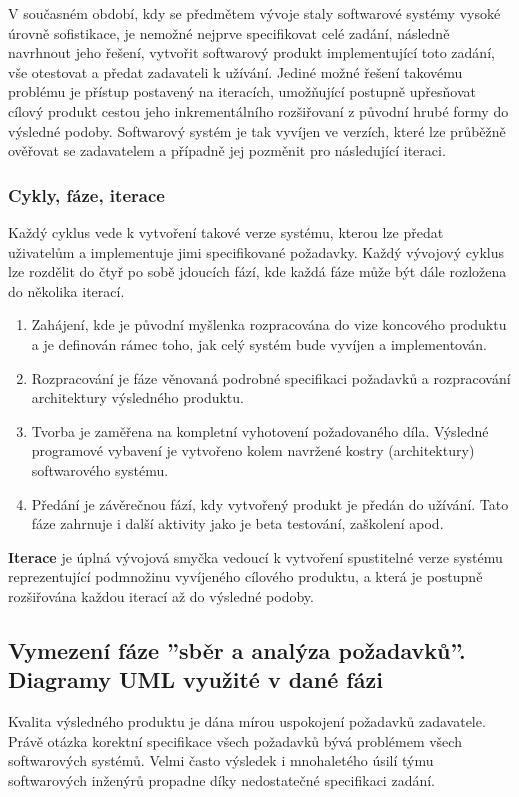 V současném období, kdy se předmětem vývoje staly softwarové systémy vysoké úrovně sofistikace, je nemožné nejprve specifikovat celé zadání, následně navrhnout jeho řešení, vytvořit softwarový produkt implementující toto zadání, vše otestovat a předat zadavateli k užívání.  Jediné možné řešení takovému problému je přístup postavený na iteracích, umožňující postupně upřesňovat cílový produkt cestou jeho inkrementálního rozšiřovaní z původní hrubé formy do výsledné podoby.  Softwarový systém je tak vyvíjen ve verzích, které lze průběžně ověřovat se zadavatelem a případně jej pozměnit pro následující iteraci.

\subsubsection{Cykly, fáze, iterace}
Každý cyklus vede k vytvoření takové verze systému, kterou lze předat uživatelům a  implementuje jimi specifikované požadavky.
Každý vývojový cyklus lze rozdělit do čtyř po sobě jdoucích fází, kde každá fáze může být dále rozložena do několika iterací. 
\begin{enumerate}
\item Zahájení, kde je původní myšlenka rozpracována do vize koncového produktu a je definován rámec toho, jak celý systém bude vyvíjen a implementován. 
\item Rozpracování je fáze věnovaná podrobné specifikaci požadavků a rozpracování architektury výsledného produktu. 
\item Tvorba je zaměřena na kompletní vyhotovení požadovaného díla.  Výsledné  programové vybavení je vytvořeno kolem navržené kostry (architektury) softwarového systému. 
\item Předání je závěrečnou fází, kdy vytvořený produkt je předán do užívání.  Tato fáze zahrnuje i další aktivity jako je beta testování, zaškolení apod. 
\end{enumerate}

\textbf{Iterace} je úplná vývojová smyčka vedoucí k vytvoření spustitelné verze systému reprezentující podmnožinu vyvíjeného cílového produktu, a která je postupně rozšiřována každou iterací až do výsledné podoby.

\subsection{Vymezení fáze ''sběr a analýza požadavků''. Diagramy UML využité v dané fázi}
Kvalita výsledného produktu je dána mírou uspokojení požadavků zadavatele. Právě otázka korektní specifikace všech požadavků bývá problémem všech softwarových systémů. Velmi často výsledek i mnohaletého úsilí týmu softwarových inženýrů propadne díky nedostatečné specifikaci zadání.

